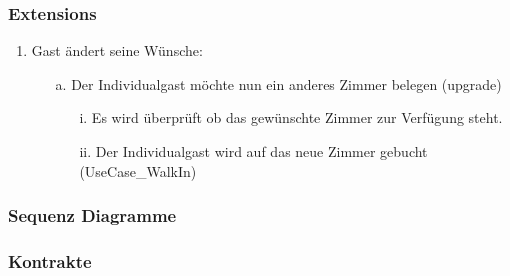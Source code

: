 \documentclass[./detailed_overview_usecases.tex]{subfiles}
\begin{document}
    \subsubsection*{Extensions}
    \begin{enumerate}
        \item Gast ändert seine Wünsche:
        \begin{itemize}
            \item[a.] Der Individualgast möchte nun ein anderes Zimmer belegen (upgrade)
            \begin{itemize}
                \item[i.] Es wird überprüft ob das gewünschte Zimmer zur Verfügung steht.
                \item[ii.] Der Individualgast wird auf das neue Zimmer gebucht (UseCase_WalkIn)
            \end{itemize}
        \end{itemize}
    \end{enumerate}

    \subsubsection{Sequenz Diagramme}
    \subsubsection{Kontrakte}
\end{document}
